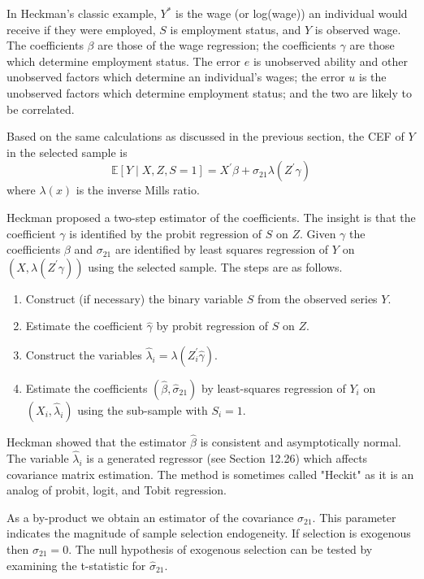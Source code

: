 \documentclass[10pt]{article}
\begin{document}
In Heckman's classic example, $Y^{*}$ is the wage (or log(wage)) an individual would receive if they were employed, $S$ is employment status, and $Y$ is observed wage. The coefficients $\beta$ are those of the wage regression; the coefficients $\gamma$ are those which determine employment status. The error $e$ is unobserved ability and other unobserved factors which determine an individual's wages; the error $u$ is the unobserved factors which determine employment status; and the two are likely to be correlated.

Based on the same calculations as discussed in the previous section, the CEF of $Y$ in the selected sample is
$$
\mathbb{E}[Y \mid X, Z, S=1]=X^{\prime} \beta+\sigma_{21} \lambda\left(Z^{\prime} \gamma\right)
$$
where $\lambda(x)$ is the inverse Mills ratio.

Heckman proposed a two-step estimator of the coefficients. The insight is that the coefficient $\gamma$ is identified by the probit regression of $S$ on $Z$. Given $\gamma$ the coefficients $\beta$ and $\sigma_{21}$ are identified by least squares regression of $Y$ on $\left(X, \lambda\left(Z^{\prime} \gamma\right)\right)$ using the selected sample. The steps are as follows.

\begin{enumerate}
  \item Construct (if necessary) the binary variable $S$ from the observed series $Y$.

  \item Estimate the coefficient $\widehat{\gamma}$ by probit regression of $S$ on $Z$.

  \item Construct the variables $\widehat{\lambda}_{i}=\lambda\left(Z_{i}^{\prime} \widehat{\gamma}\right)$.

  \item Estimate the coefficients $\left(\widehat{\beta}, \widehat{\sigma}_{21}\right)$ by least-squares regression of $Y_{i}$ on $\left(X_{i}, \widehat{\lambda}_{i}\right)$ using the sub-sample with $S_{i}=1$.

\end{enumerate}
Heckman showed that the estimator $\widehat{\beta}$ is consistent and asymptotically normal. The variable $\widehat{\lambda}_{i}$ is a generated regressor (see Section 12.26) which affects covariance matrix estimation. The method is sometimes called "Heckit" as it is an analog of probit, logit, and Tobit regression.

As a by-product we obtain an estimator of the covariance $\sigma_{21}$. This parameter indicates the magnitude of sample selection endogeneity. If selection is exogenous then $\sigma_{21}=0$. The null hypothesis of exogenous selection can be tested by examining the t-statistic for $\widehat{\sigma}_{21}$.
\end{document}
